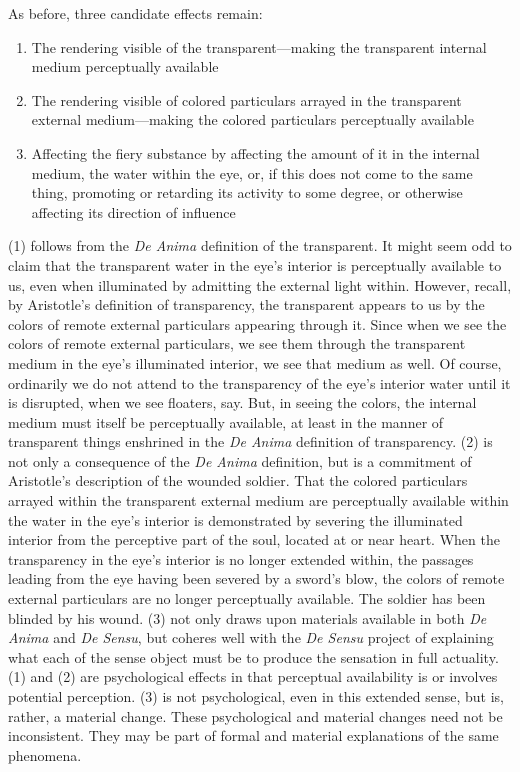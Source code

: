 As before, three candidate effects remain:
\begin{enumerate}[(1)]
	\item The rendering visible of the transparent---making the transparent internal me\-di\-um perceptually available
	\item The rendering visible of colored particulars arrayed in the transparent external me\-di\-um\----making the colored particulars perceptually available
	\item Affecting the fiery substance by affecting the amount of it in the internal me\-di\-um, the water within the eye, or, if this does not come to the same thing, promoting or retarding its activity to some degree, or otherwise affecting its direction of influence
\end{enumerate}
(1) follows from the \emph{De Anima} definition of the transparent. It might seem odd to claim that the transparent water in the eye's interior is perceptually available to us, even when illuminated by admitting the external light within. However, recall, by Aristotle's definition of transparency, the transparent appears to us by the colors of remote external particulars appearing through it. Since when we see the colors of remote external particulars, we see them through the transparent medium in the eye's illuminated interior, we see that medium as well. Of course, ordinarily we do not attend to the transparency of the eye's interior water until it is disrupted, when we see floaters, say. But, in seeing the colors, the internal medium must itself be perceptually available, at least in the manner of transparent things enshrined in the \emph{De Anima} definition of transparency. (2) is not only a consequence of the \emph{De Anima} definition, but is a commitment of Aristotle's description of the wounded soldier. That the colored particulars arrayed within the transparent external medium are perceptually available within the water in the eye's interior is demonstrated by severing the illuminated interior from the perceptive part of the soul, located at or near heart. When the transparency in the eye's interior is no longer extended within, the passages leading from the eye having been severed by a sword's blow, the colors of remote external particulars are no longer perceptually available. The soldier has been blinded by his wound. (3) not only draws upon materials available in both \emph{De Anima} and \emph{De Sensu}, but coheres well with the \emph{De Sensu} project of explaining what each of the sense object must be to produce the sensation in full actuality. (1) and (2) are psychological effects in that perceptual availability is or involves potential perception. (3) is not psychological, even in this extended sense, but is, rather, a material change. These psychological and material changes need not be inconsistent. They may be part of formal and material explanations of the same phenomena. 

